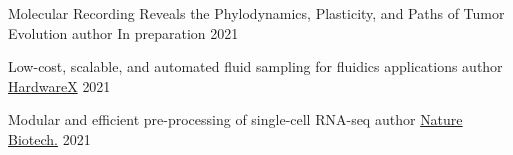 

\begin{cvhonors}


  \cvhonor
    {Molecular Recording Reveals the Phylodynamics, Plasticity, and Paths of Tumor Evolution} %
    {author} %
    {In preparation} %
    {2021} %

  \cvhonor
    {Low-cost, scalable, and automated fluid sampling for fluidics applications} %
    {author} %
    {\href{https://doi.org/10.1016/j.ohx.2021.e00201}{HardwareX}} %
    {2021} %

  \cvhonor
    {Modular and efficient pre-processing of single-cell RNA-seq} %
    {author} %
    {\href{https://doi.org/10.1038/s41587-021-00870-2}{Nature Biotech.}} %
    {2021} %
\end{cvhonors}
